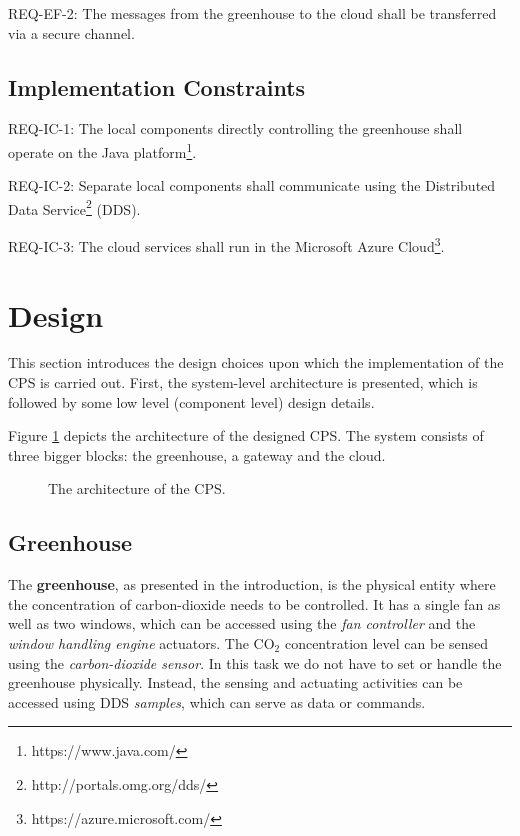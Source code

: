 \documentclass[a4paper, 11pt]{article}
\begin{document}
	REQ-EF-2: The messages from the greenhouse to the cloud shall be transferred via a secure channel.
	
	\subsection{Implementation Constraints}
	REQ-IC-1: The local components directly controlling the greenhouse shall operate on the Java platform\footnote{https://www.java.com/}.
	
	REQ-IC-2: Separate local components shall communicate using the Distributed Data Service\footnote{http://portals.omg.org/dds/} (DDS).
	
	REQ-IC-3: The cloud services shall run in the Microsoft Azure Cloud\footnote{https://azure.microsoft.com/}.
	
	\section{Design}
	\label{sec:design}
	This section introduces the design	choices upon which the implementation of the CPS is carried out. First, the system-level architecture is presented, which is followed by some low level (component level) design details.
	
	Figure \ref{fig:architecture} depicts the architecture of the designed CPS. The system consists of three bigger blocks: the greenhouse, a gateway and the cloud. 
		
		\begin{figure}[h!]
			\center
			\caption{The architecture of the CPS.}
			\label{fig:architecture}
		\end{figure}

	\subsection{Greenhouse}
	\label{sec:greenhouse}
	The \textbf{greenhouse}, as presented in the introduction, is the physical entity where the concentration of carbon-dioxide needs to be controlled. It has a single fan as well as two windows, which can be accessed using the \emph{fan controller} and the \emph{window handling engine} actuators. The CO$_2$ concentration level can be sensed using the \emph{carbon-dioxide sensor}. In this task we do not have to set or handle the greenhouse physically. Instead, the sensing and actuating activities can be accessed using DDS \emph{samples}, which can serve as data or commands.
	
\end{document}
